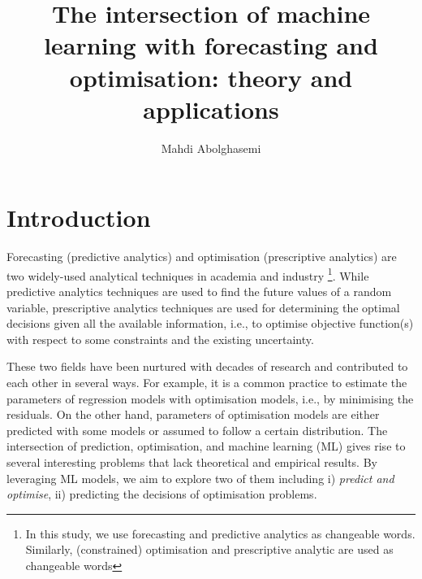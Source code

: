 \documentclass[graybox]{svmult}
\begin{document}
\title*{The intersection of machine learning with forecasting and optimisation: theory and applications}
\author{Mahdi Abolghasemi}
%


\maketitle


\section{Introduction} \label{sec:intro}

Forecasting (predictive analytics) and optimisation (prescriptive analytics) are two widely-used analytical techniques in academia and industry \footnote{In this study, we use forecasting and predictive analytics as changeable words. Similarly,  (constrained) optimisation and prescriptive analytic are used as changeable words}. While predictive analytics techniques are used to find the future values of a random variable, prescriptive analytics techniques are used for determining the optimal decisions given all the available information, i.e., to optimise objective function(s) with respect to some constraints and the existing uncertainty.

These two fields have been nurtured with decades of research and contributed to each other in several ways. For example, it is a common practice to estimate the parameters of regression models with optimisation models, i.e., by minimising the residuals. On the other hand, parameters of optimisation models are either predicted with some models or assumed to follow a certain distribution. The intersection of prediction, optimisation, and machine learning (ML) gives rise to several interesting problems that lack theoretical and empirical results. By leveraging ML models, we aim to explore two of them including i) \textit{predict and optimise}, ii) predicting the decisions of optimisation problems.
\end{document}
